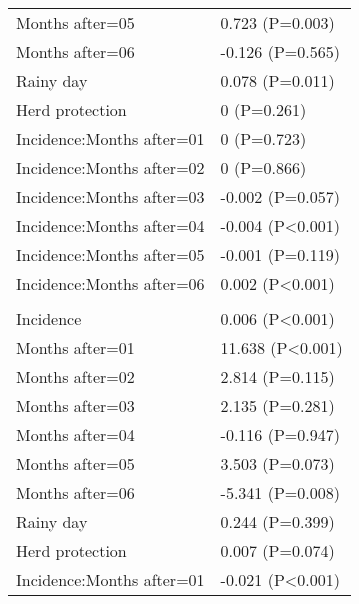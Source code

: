 \documentclass[]{article}
\begin{document}
\begin{longtable}[t]{ll}
\hspace{1em}Months after=05 & 0.723 (P=0.003)\\
\hspace{1em}Months after=06 & -0.126 (P=0.565)\\
\hspace{1em}Rainy day & 0.078 (P=0.011)\\
\hspace{1em}Herd protection & 0 (P=0.261)\\
\hspace{1em}Incidence:Months after=01 & 0 (P=0.723)\\
\hspace{1em}Incidence:Months after=02 & 0 (P=0.866)\\
\hspace{1em}Incidence:Months after=03 & -0.002 (P=0.057)\\
\hspace{1em}Incidence:Months after=04 & -0.004 (P<0.001)\\
\hspace{1em}Incidence:Months after=05 & -0.001 (P=0.119)\\
\hspace{1em}Incidence:Months after=06 & 0.002 (P<0.001)\\
\addlinespace[1.5em]
\multicolumn{2}{l}{\textbf{Temporary not field worker}}\\
\hspace{1em}Incidence & 0.006 (P<0.001)\\
\hspace{1em}Months after=01 & 11.638 (P<0.001)\\
\hspace{1em}Months after=02 & 2.814 (P=0.115)\\
\hspace{1em}Months after=03 & 2.135 (P=0.281)\\
\hspace{1em}Months after=04 & -0.116 (P=0.947)\\
\hspace{1em}Months after=05 & 3.503 (P=0.073)\\
\hspace{1em}Months after=06 & -5.341 (P=0.008)\\
\hspace{1em}Rainy day & 0.244 (P=0.399)\\
\hspace{1em}Herd protection & 0.007 (P=0.074)\\
\hspace{1em}Incidence:Months after=01 & -0.021 (P<0.001)\\

\end{longtable}
\end{document}
